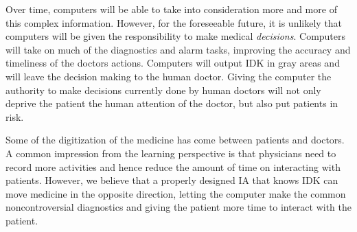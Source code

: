 \documentclass[11pt]{pnas-new}
\begin{document}
  Over time, computers will be able to take into consideration more
  and more of this complex information. However, for the foreseeable
  future, it is unlikely that computers will be given the
  responsibility to make medical {\em decisions}. Computers
  will take on much of the diagnostics and alarm tasks, improving the
  accuracy and timeliness of the doctors actions. Computers will
  output IDK in gray areas and will leave the decision making to the
  human doctor. Giving the computer the authority to make decisions
  currently done by human doctors will {\color{blue}not only} deprive the patient the human
  attention of the doctor{\color{blue}, but also put patients in risk}.

  Some of the digitization of the medicine has come between patients
  and doctors. {\color{blue}A common impression from the learning perspective is that physicians need to record more activities and hence reduce the amount of time on interacting with patients. However, we} %
  believe that {\color{blue}a properly designed } IA {\color{blue}that knows IDK} can
  move medicine in the opposite direction, letting the computer make
  the common noncontroversial diagnostics and giving the patient more
  time to interact with the patient.
\end{document}
